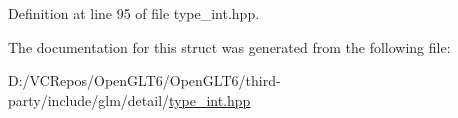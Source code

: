 Definition at line 95 of file type\+\_\+int.\+hpp.



The documentation for this struct was generated from the following file\+:\begin{DoxyCompactItemize}
\item 
D\+:/\+V\+C\+Repos/\+Open\+G\+L\+T6/\+Open\+G\+L\+T6/third-\/party/include/glm/detail/\mbox{\hyperlink{type__int_8hpp}{type\+\_\+int.\+hpp}}\end{DoxyCompactItemize}
